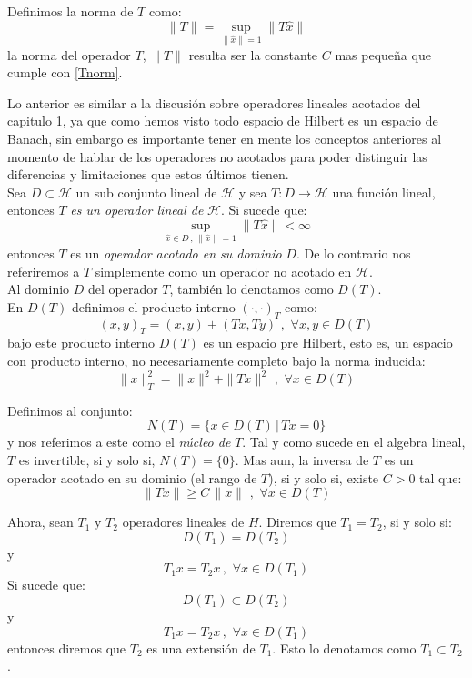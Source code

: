 \documentclass[12pt]{book}
\numberwithin{equation}{chapter}
\def\rar{\rightarrow}
\def\H{\mathcal{H}}
\begin{document}
Definimos la norma de $T$ como:
$$ \|T\|= \sup_{\|\hat{x}\|=1} \|T\hat{x} \| $$
la norma del operador $T$, $\|T\|$ resulta ser la constante $C$ mas peque\~na que cumple con \eqref{Tnorm}.

Lo anterior es similar a la discusi\'on sobre operadores lineales acotados del capitulo 1, ya que como hemos visto todo espacio de Hilbert es un espacio de Banach, sin embargo es importante tener en mente los conceptos anteriores al momento de hablar de los operadores no acotados para poder distinguir las diferencias y limitaciones que estos \'ultimos tienen.\\

Sea $D\subset \H$ un sub conjunto lineal de $\H$ y sea $T: D \rar \H $ una funci\'on lineal, entonces $T$ \emph{es un operador lineal de} $\H$. Si sucede que:
$$ \sup_{\hat{x}\in D\,,\, \|\hat{x}\|=1} \|T\hat{x} \| < \infty $$
entonces $T$ es un \emph{operador acotado en su dominio} $D$. De lo contrario nos referiremos a $T$ simplemente como un operador no acotado en $\H$.\\

Al dominio $D$ del operador $T$, tambi\'en lo denotamos como $D(T)$.\\
En $D(T)$ definimos el producto interno $( \cdot , \cdot )_{T}$ como:
$$ (x,y)_{T}=(x,y)+(Tx,Ty)  \,\,,\,\, \forall x,y \in D(T)$$
bajo este producto interno $D(T)$ es un espacio pre Hilbert, esto es, un espacio con producto interno, no necesariamente completo bajo la norma inducida:
$$ \|x\|_{T}^{2}= \|x\|^{2} + \|Tx\|^{2} \,\,,\,\, \forall x \in D(T) $$

Definimos al conjunto:
$$ N(T)=\{ x \in D(T) \,|\, Tx=0 \} $$
y nos referimos a este como el \emph{n\'ucleo de} $T$. Tal y como sucede en el algebra lineal, $T$ es invertible, si y solo si, $N(T)=\{ 0 \}$. Mas aun, la inversa de $T$ es un operador acotado en su dominio (el rango de $T$), si y solo si, existe $C>0$ tal que:
$$ \|Tx\| \geq C\, \| x \| \,\,,\,\, \forall x \in D(T) $$

Ahora, sean $T_{1}$ y $T_{2}$ operadores lineales de $H$. Diremos que $T_{1}=T_{2}$, si y solo si:
$$ D(T_{1}) = D(T_{2}) $$
y 
$$ T_{1}x=T_{2}x \,,\,\, \forall x \in D(T_{1}) $$
Si sucede que:
$$ D(T_{1}) \subset D(T_{2}) $$
y 
$$ T_{1}x=T_{2}x \,,\,\, \forall x \in D(T_{1}) $$
entonces diremos que $T_{2}$ es una extensi\'on de $T_{1}$. Esto lo denotamos como $T_{1} \subset T_{2}$.

\newpage %
\end{document}
